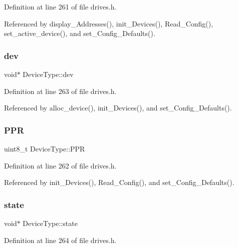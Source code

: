Definition at line 261 of file drives.\+h.



Referenced by display\+\_\+\+Addresses(), init\+\_\+\+Devices(), Read\+\_\+\+Config(), set\+\_\+active\+\_\+device(), and set\+\_\+\+Config\+\_\+\+Defaults().

\mbox{\label{structDeviceType_a59fc3b3cb45f8ee0cd1016bd64804d3b}} 
\subsubsection{\texorpdfstring{dev}{dev}}
{\footnotesize\ttfamily void$\ast$ Device\+Type\+::dev}



Definition at line 263 of file drives.\+h.



Referenced by alloc\+\_\+device(), init\+\_\+\+Devices(), and set\+\_\+\+Config\+\_\+\+Defaults().

\mbox{\label{structDeviceType_ae0e59c6c17582ff80bdab3f2010e8d57}} 
\subsubsection{\texorpdfstring{P\+PR}{PPR}}
{\footnotesize\ttfamily uint8\+\_\+t Device\+Type\+::\+P\+PR}



Definition at line 262 of file drives.\+h.



Referenced by init\+\_\+\+Devices(), Read\+\_\+\+Config(), and set\+\_\+\+Config\+\_\+\+Defaults().

\mbox{\label{structDeviceType_ad0fc43d63606bab6c259047e36512e08}} 
\subsubsection{\texorpdfstring{state}{state}}
{\footnotesize\ttfamily void$\ast$ Device\+Type\+::state}



Definition at line 264 of file drives.\+h.



